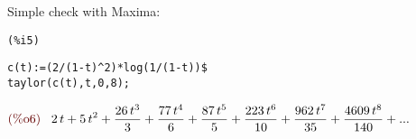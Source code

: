 Simple check with Maxima:

\noindent
\begin{minipage}[t]{8ex}{\color{red}\bf
\begin{verbatim}
(%i5) 
\end{verbatim}}
\end{minipage}
\begin{minipage}[t]{\textwidth}{\color{blue}
\begin{verbatim}
c(t):=(2/(1-t)^2)*log(1/(1-t))$
taylor(c(t),t,0,8);
\end{verbatim}}
\end{minipage}
\begin{math}\displaystyle
\parbox{8ex}{\color{labelcolor}(\%o6)}
2\,t+5\,{t}^{2}+\frac{26\,{t}^{3}}{3}+\frac{77\,{t}^{4}}{6}+\frac{87\,{t}^{5}}{5}+\frac{223\,{t}^{6}}{10}+\frac{962\,{t}^{7}}{35}+\frac{4609\,{t}^{8}}{140}+...
\end{math}







 




